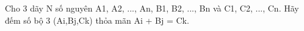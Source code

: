 Cho 3 dãy N số nguyên A1, A2, ..., An, B1, B2, ..., Bn và C1, C2, ..., Cn. Hãy đếm số bộ 3 (Ai,Bj,Ck) thỏa mãn Ai + Bj = Ck.  

\